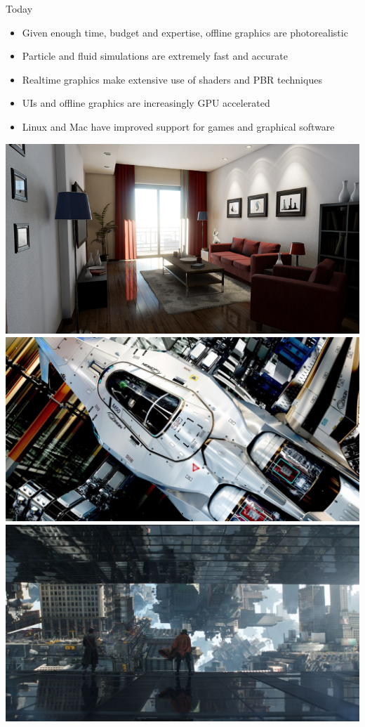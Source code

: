 \documentclass{lug}
\newcommand{\splitslide}[4]{
    \noindent
    \begin{minipage}{#1 \textwidth - #2 }
        #3
    \end{minipage}%
    \hspace{ \dimexpr #2 * 2 \relax }%
    \begin{minipage}{\textwidth - #1 \textwidth - #2 }
        #4
    \end{minipage}
}
\begin{document}
\begin{frame}{Today}
    \splitslide{0.65}{.7em}{
        \small
        \begin{itemize}
            \item Given enough time, budget and expertise, offline graphics are photorealistic
            \item Particle and fluid simulations are extremely fast and accurate
            \item Realtime graphics make extensive use of shaders and PBR techniques
            \item UIs and offline graphics are increasingly GPU accelerated
            \item Linux and Mac have improved support for games and graphical software
        \end{itemize}
    }{
        \includegraphics[width=\textwidth]{graphics/unreal4_damn.jpg} \\
        \includegraphics[width=\textwidth]{graphics/star_citizen_pbr} \\
        \includegraphics[width=\textwidth]{graphics/dr_strange} \\
}
\end{frame}
\end{document}

